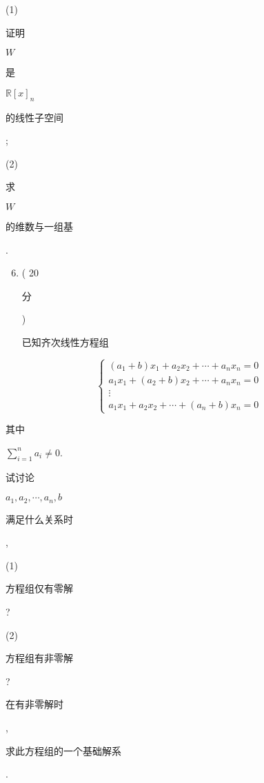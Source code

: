 \documentclass[10pt]{article}
\begin{document}
(1) \begin{CJK}{UTF8}{mj}证明\end{CJK} $W$ \begin{CJK}{UTF8}{mj}是\end{CJK} $\mathbb{R}[x]_{n}$ \begin{CJK}{UTF8}{mj}的线性子空间\end{CJK};

(2) \begin{CJK}{UTF8}{mj}求\end{CJK} $W$ \begin{CJK}{UTF8}{mj}的维数与一组基\end{CJK}.

\begin{enumerate}
  \setcounter{enumi}{5}
  \item ( 20 \begin{CJK}{UTF8}{mj}分\end{CJK}) \begin{CJK}{UTF8}{mj}已知齐次线性方程组\end{CJK}
\end{enumerate}
$$
\left\{\begin{array}{c}
\left(a_{1}+b\right) x_{1}+a_{2} x_{2}+\cdots+a_{n} x_{n}=0 \\
a_{1} x_{1}+\left(a_{2}+b\right) x_{2}+\cdots+a_{n} x_{n}=0 \\
\vdots \\
a_{1} x_{1}+a_{2} x_{2}+\cdots+\left(a_{n}+b\right) x_{n}=0
\end{array}\right.
$$
\begin{CJK}{UTF8}{mj}其中\end{CJK} $\sum_{i=1}^{n} a_{i} \neq 0$. \begin{CJK}{UTF8}{mj}试讨论\end{CJK} $a_{1}, a_{2}, \cdots, a_{n}, b$ \begin{CJK}{UTF8}{mj}满足什么关系时\end{CJK},

(1) \begin{CJK}{UTF8}{mj}方程组仅有零解\end{CJK}?

(2) \begin{CJK}{UTF8}{mj}方程组有非零解\end{CJK}? \begin{CJK}{UTF8}{mj}在有非零解时\end{CJK}, \begin{CJK}{UTF8}{mj}求此方程组的一个基础解系\end{CJK}.
\end{document}
